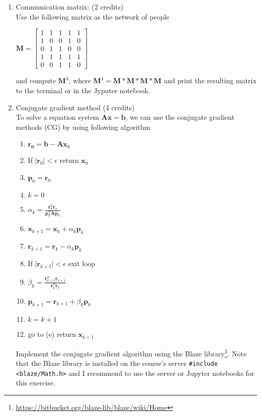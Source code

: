 \documentclass[11pt]{article}
\begin{document}
\begin{enumerate}

\item Communication matrix: (2 credits)\\
Use the following matrix as the network of people
\begin{center}
$
\mathbf{M} = \left[\begin{matrix}
1 & 1 & 1 & 1 & 1 \\
1 & 0 & 0 & 1 & 0 \\
0 & 1 & 1 & 0 & 0 \\
1 & 1 & 1 & 1 & 1 \\
0 & 0 & 1 & 1 & 0
\end{matrix}\right]
$
\end{center}
and compute $\mathbf{M}^4$, where $\mathbf{M}^4= \mathbf{M}*\mathbf{M}*\mathbf{M}*\mathbf{M}$ and print the resulting matrix to the terminal or in the Jyputer notebook. 

\item Conjugate gradient method (4 credits)\\
To solve a equation system $\mathbf{A}\mathbf{x}=\mathbf{b}$, we can use the conjugate gradient methods (CG) by using following algorithm
\begin{enumerate}
\item $\mathbf{r_0} = \mathbf{b} - \mathbf{A} \mathbf{x}_0$
\item If $\vert \mathbf{r}_0 \vert< \epsilon$ return  $\mathbf{x}_0$
\item $\mathbf{p}_0=\mathbf{r}_0$
\item $k=0$
\item $\alpha_k = \frac{\mathbf{r}_k^T\mathbf{r}_k}{\mathbf{p}_k^T\mathbf{A}\mathbf{p}_k}$
\item $ \mathbf{x}_{k+1} = \mathbf{x}_k + \alpha_k \mathbf{p}_k$
\item $ \mathbf{r}_{k+1} = \mathbf{r}_k - \alpha_k \mathbf{p}_k$
\item If $\vert \mathbf{r}_{k+1} \vert < \epsilon$ exit loop
\item $\beta_k = \frac{\mathbf{r}_{k+1}^T\mathbf{r}_{k+1}}{\mathbf{r}_k^T\mathbf{r}_k}$
\item $\mathbf{p}_{k+1}=\mathbf{r}_{k+1} + \beta_k \mathbf{p}_k$
\item $k=k+1$
\item go to (e)
return $\mathbf{x}_{k+1}$
\end{enumerate}
Implement the conjugate gradient algorithm using the Blaze library\footnote{\url{https://bitbucket.org/blaze-lib/blaze/wiki/Home}}. Note that the Blaze library is installed on the course's server \lstinline|#include <blaze/Math.h>| and I recommend to use the server or Jupyter notebooks for this exercise.


\end{enumerate}
\end{document}
